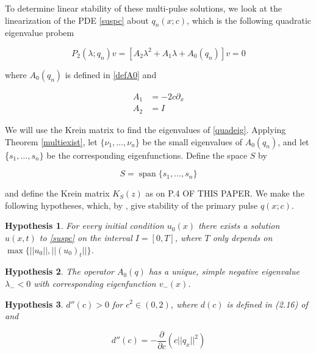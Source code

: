 \documentclass[12pt]{article}
\DeclareMathOperator{\spn}{span}
\newtheorem{hypothesis}{Hypothesis}
\begin{document}
To determine linear stability of these multi-pulse solutions, we look at the linearization of the PDE \eqref{suspc} about $q_n(x; c)$, which is the following quadratic eigenvalue probem

\begin{equation}\label{quadeig}
P_2(\lambda; q_n)v =  [A_2 \lambda^2 + A_1 \lambda + A_0(q_n)]v = 0
\end{equation}

where $A_0(q_n)$ is defined in \eqref{defA0} and 

\begin{align}
A_1 &= -2 c \partial_x \\
A_2 &= I
\end{align}

We will use the Krein matrix to find the eigenvalues of \eqref{quadeig}. Applying Theorem \ref{multiexist}, let $\{\nu_1, \dots, \nu_n\}$ be the small eigenvalues of $A_0(q_n)$, and let \{$s_1, \dots, s_n\}$ be the corresponding eigenfunctions. Define the space $S$ by

\begin{equation}\label{defS}
S = \spn\{s_1, \dots, s_n \}
\end{equation}

and define the Krein matrix $K_S(z)$ as on P.4 OF THIS PAPER. We make the following hypotheses, which, by \cite{Grillakis1987}, give stability of the primary pulse $q(x; c)$.

\begin{hypothesis}\label{PDEexisthyp}
For every initial condition $u_0(x)$ there exists a solution $u(x, t)$ to \eqref{suspc} on the interval $I = [0, T]$, where $T$ only depends on $\max{ \{ ||u_0||, ||(u_0)_t|| \} }$.
\end{hypothesis}

\begin{hypothesis}\label{A0neg}
The operator $A_0(q)$ has a unique, simple negative eigenvalue $\lambda_- < 0$ with corresponding eigenfunction $v_-(x)$.
\end{hypothesis}

\begin{hypothesis}\label{dccpos}
$d''(c) > 0$ for $c^2 \in (0, 2)$, where $d(c)$ is defined in (2.16) of \cite{Grillakis1987} and 

\begin{equation}\label{dcc}
d''(c) = -\frac{\partial}{\partial c} \left( c ||q_x||^2 \right)
\end{equation}
\end{hypothesis}
\end{document}
